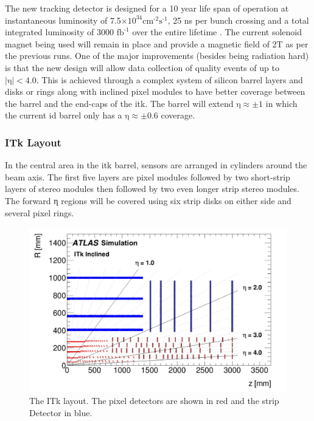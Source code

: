 The new tracking detector is designed for a 10 year life span of operation at instantaneous luminosity of 
7.5$\times \textrm{10}^{\textrm{34}}\textrm{cm}^{\textrm{-2}}\textrm{s}^{\textrm{-1}}$, 25 ns per bunch crossing and a total 
integrated luminosity of 3000 f$\textrm{b}^{\textrm{-1}}$ over the entire lifetime \cite{itk-tech}. The current solenoid magnet being used will remain in place and 
provide a magnetic field of 2T as per the previous runs. One of the major improvements (besides being radiation hard) is that the new design will allow 
data collection of quality events of up to $|\textrm{η}| < \textrm{4.0}$. This is achieved through a complex system of silicon barrel layers and disks or rings along with 
inclined pixel modules to have better coverage between the barrel and the end-caps of the \gls{itk}. The barrel will extend $\textrm{η} \approx\pm \textrm{1}$ 
in which the current \gls{id} barrel only has a $\textrm{η} \approx\pm \textrm{0.6}$ coverage.

\subsubsection{ITk Layout}

In the central area in the \gls{itk} barrel, sensors are arranged in cylinders around the beam axis. The first five layers are pixel modules followed by two short-strip layers 
of stereo modules then followed by two even longer strip stereo modules. The forward η regions will be covered using six strip disks on either side and several pixel 
rings. 

\begin{figure}[H]
  \centering
  \includegraphics[scale=0.6]{figs/ch3/itk-layout.jpg}
  \caption{ The ITk layout. The pixel detectors are shown in red and the strip Detector in blue.  \cite{itk-tech}}
\label{fig:3.15}
\end{figure}

